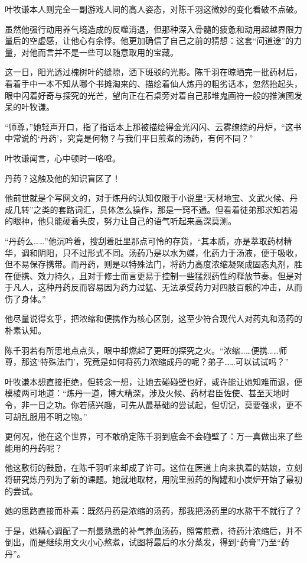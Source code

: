叶牧谦本人则完全一副游戏人间的高人姿态，对陈千羽这微妙的变化看破不点破。

虽然他强行动用养气境造成的反噬消退，但那种深入骨髓的疲惫和动用超越界限力量后的空虚感，让他心有余悸。他更加确信了自己之前的猜想：这套“问道途”的力量，对他而言并不是一些可以随意取用的宝藏。

这一日，阳光透过槐树叶的缝隙，洒下斑驳的光影。陈千羽在晾晒完一批药材后，看着手中一本不知从哪个书摊淘来的、描绘着仙人炼丹的粗劣话本，忽然抬起头，眼中闪着好奇与探究的光芒，望向正在石桌旁对着自己那堆鬼画符一般的推演图发呆的叶牧谦。

“师尊，”她轻声开口，指了指话本上那被描绘得金光闪闪、云雾缭绕的丹炉，“这书中常说的‘丹药’，究竟是何物？与我们平日煎煮的汤药，有何不同？”

叶牧谦闻言，心中顿时一咯噔。

丹药？这触及他的知识盲区了！

他前世就是个写网文的，对于炼丹的认知仅限于小说里“天材地宝、文武火候、丹成几转”之类的套路词汇，具体怎么操作，那是一窍不通。但看着徒弟那求知若渴的眼神，他只能硬着头皮，努力让自己的语气听起来高深莫测。

“丹药么……”他沉吟着，搜刮着肚里那点可怜的存货，“其本质，亦是萃取药材精华，调和阴阳，只不过形式不同。汤药乃是以水为媒，化药力于汤液，便于吸收，但不易保存携带。而丹药，则是以特殊法门，将药力高度浓缩凝聚成固态丸剂，胜在便携、效力持久，且对于修士而言更易于控制一些猛烈药性的释放节奏。但是对于凡人，这种丹药反而容易因为药力过猛、无法承受药力对四肢百骸的冲击，从而伤了身体。”

他尽量说得玄乎，把浓缩和便携作为核心区别，这至少符合现代人对药丸和汤药的朴素认知。

陈千羽若有所思地点点头，眼中却燃起了更旺的探究之火。“浓缩……便携……师尊，那这‘特殊法门’，究竟是如何将药力浓缩成丹的呢？弟子……可以试试吗？”

叶牧谦本想直接拒绝，但转念一想，让她去碰碰壁也好，或许能让她知难而退，便模棱两可地道：“炼丹一道，博大精深，涉及火候、药材君臣佐使、甚至天地时令，非一日之功。你若感兴趣，可先从最基础的尝试起，但切记，莫要强求，更不可胡乱服用不明之物。”

更何况，他在这个世界，可不敢确定陈千羽到底会不会碰壁了：万一真做出来了些能用的丹药呢？

他这敷衍的鼓励，在陈千羽听来却成了许可。这位在医道上向来执着的姑娘，立刻将研究炼丹列为了新的课题。她就地取材，用院里煎药的陶罐和小炭炉开始了最初的尝试。

她的思路直接而朴素：既然丹药是浓缩的汤药，那我把汤药里的水熬干不就行了？

于是，她精心调配了一剂最熟悉的补气养血汤药，照常煎煮，待药汁浓缩后，并不倒出，而是继续用文火小心熬煮，试图将最后的水分蒸发，得到“药膏”乃至“药丹”。

